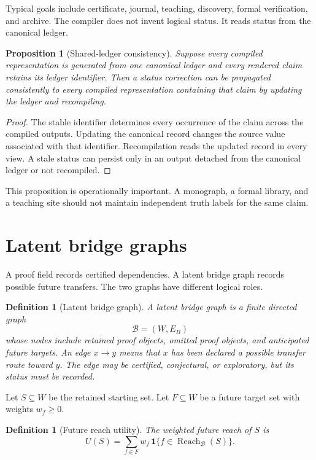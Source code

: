 \documentclass[11pt,oneside]{article}
\theoremstyle{komorebiplain}
\newtheorem{proposition}[theorem]{Proposition}
\theoremstyle{komorebidefinition}
\newtheorem{definition}[theorem]{Definition}
\theoremstyle{komorebiremark}
\newcommand{\Bcal}{\mathcal B}
\newcommand{\Reach}{\operatorname{Reach}}
\begin{document}
Typical goals include certificate, journal, teaching, discovery, formal verification, and archive. The compiler does not invent logical status. It reads status from the canonical ledger.

\begin{proposition}[Shared-ledger consistency]
\label{res:12:2}
Suppose every compiled representation is generated from one canonical ledger and every rendered claim retains its ledger identifier. Then a status correction can be propagated consistently to every compiled representation containing that claim by updating the ledger and recompiling.
\end{proposition}

\begin{proof}
The stable identifier determines every occurrence of the claim across the compiled outputs. Updating the canonical record changes the source value associated with that identifier. Recompilation reads the updated record in every view. A stale status can persist only in an output detached from the canonical ledger or not recompiled.
\end{proof}

This proposition is operationally important. A monograph, a formal library, and a teaching site should not maintain independent truth labels for the same claim.


\section{Latent bridge graphs}
\label{sec:old13}

A proof field records certified dependencies. A latent bridge graph records possible future transfers. The two graphs have different logical roles.

\begin{definition}[Latent bridge graph]
\label{res:13:1}
A latent bridge graph is a finite directed graph
\[
\Bcal=(W,E_B)
\]
whose nodes include retained proof objects, omitted proof objects, and anticipated future targets. An edge $x\to y$ means that $x$ has been declared a possible transfer route toward $y$. The edge may be certified, conjectural, or exploratory, but its status must be recorded.
\end{definition}

Let $S\subseteq W$ be the retained starting set. Let $F\subseteq W$ be a future target set with weights $w_f\ge0$.

\begin{definition}[Future reach utility]
\label{res:13:2}
The weighted future reach of $S$ is
\[
U(S)=\sum_{f\in F}w_f\,
\mathbf 1\{f\in\Reach_{\Bcal}(S)\}.
\]
\end{definition}
\end{document}
